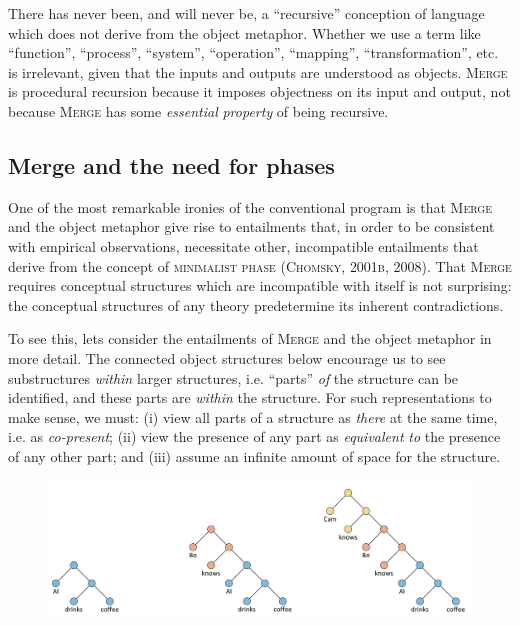   There has never been, and will never be, a “recursive” conception of language which does not derive from the object metaphor. Whether we use a term like “function”, “process”, “system”, “operation”, “mapping”, “transformation”, etc. is irrelevant, given that the inputs and outputs are understood as objects. \textsc{Merge} is procedural recursion because it imposes objectness on its input and output, not because \textsc{Merge} has some \textit{essential} \textit{property} of being recursive.

\subsection{Merge and the need for phases}

One of the most remarkable ironies of the conventional program is that \textsc{Merge} and the object metaphor give rise to entailments that, in order to be consistent with empirical observations, necessitate other, incompatible entailments that derive from the concept of \textsc{minimalist} \textsc{phase} (\textsc{Chomsky,} \textsc{2001b,} \textsc{2008)}. That \textsc{Merge} requires conceptual structures which are incompatible with itself is not surprising: the conceptual structures of any theory predetermine its inherent contradictions.

  To see this, lets consider the entailments of \textsc{Merge} and the object metaphor in more detail. The connected object structures below encourage us to see substructures \textit{within} larger structures, i.e. “parts” \textit{of} the structure can be identified, and these parts are \textit{within} the structure. For such representations to make sense, we must: (i) view all parts of a structure as \textit{there} at the same time, i.e. as \textit{co-present}; (ii) view the presence of any part as \textit{equivalent} \textit{to} the presence of any other part; and (iii) assume an infinite amount of space for the structure.

  
\begin{figure}
\includegraphics[width=\textwidth]{figures/Tilsen-img110.png}
\caption{\missingcaption}
\label{fig:}
\end{figure}
 

